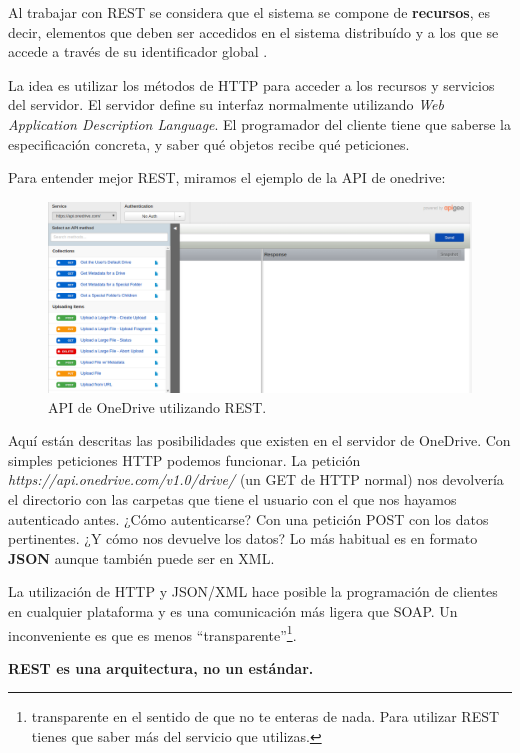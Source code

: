 Al trabajar con REST se considera que el sistema se compone de \textbf{recursos}, es decir, elementos que deben ser accedidos en el sistema distribuído y a los que se accede a través de su identificador global .

La idea es utilizar los métodos de HTTP para acceder a los recursos y servicios del servidor. El servidor define su interfaz normalmente utilizando  \textit{Web Application Description Language}. El programador del cliente tiene que saberse la especificación concreta, y saber qué objetos recibe qué peticiones.

Para entender mejor REST, miramos el ejemplo de la API de onedrive:

\begin{figure}[hbtp]
\centering
\includegraphics[width=1\textwidth]{img/REST.png}
\caption{API de OneDrive utilizando REST.}
\label{REST}
\end{figure}

Aquí están descritas las posibilidades que existen en el servidor de OneDrive. Con simples peticiones HTTP podemos funcionar. La petición \textit{https://api.onedrive.com/v1.0/drive/} (un GET de HTTP normal) nos devolvería el directorio con las carpetas que tiene el usuario con el que nos hayamos autenticado antes. ¿Cómo autenticarse? Con una petición POST con los datos pertinentes. ¿Y cómo nos devuelve los datos? Lo más habitual es en formato \textbf{JSON} aunque también puede ser en XML.

La utilización de HTTP y JSON/XML hace posible la programación de clientes en cualquier plataforma y es una comunicación más ligera que SOAP. Un inconveniente es que es menos ``transparente''\footnote{transparente en el sentido de que no te enteras de nada. Para utilizar REST tienes que saber más del servicio que utilizas.}.

\textbf{REST es una arquitectura, no un estándar.}


